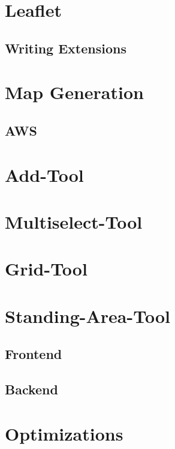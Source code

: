\section{Leaflet}

\subsection{Writing Extensions}

\section{Map Generation}

\subsection{AWS}

\section{Add-Tool}

\section{Multiselect-Tool}

\section{Grid-Tool}

\section{Standing-Area-Tool}

\subsection{Frontend}

\subsection{Backend}

\section{Optimizations}
